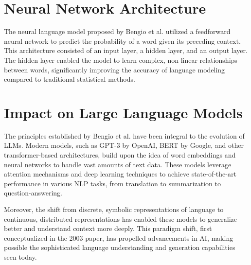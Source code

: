 \documentclass{article}
\begin{document}
\section*{Neural Network Architecture}

The neural language model proposed by Bengio et al. utilized a feedforward neural network to predict the probability of a word given its preceding context. This architecture consisted of an input layer, a hidden layer, and an output layer. The hidden layer enabled the model to learn complex, non-linear relationships between words, significantly improving the accuracy of language modeling compared to traditional statistical methods.

\section*{Impact on Large Language Models}

The principles established by Bengio et al. have been integral to the evolution of LLMs. Modern models, such as GPT-3 by OpenAI, BERT by Google, and other transformer-based architectures, build upon the idea of word embeddings and neural networks to handle vast amounts of text data. These models leverage attention mechanisms and deep learning techniques to achieve state-of-the-art performance in various NLP tasks, from translation to summarization to question-answering.

Moreover, the shift from discrete, symbolic representations of language to continuous, distributed representations has enabled these models to generalize better and understand context more deeply. This paradigm shift, first conceptualized in the 2003 paper, has propelled advancements in AI, making possible the sophisticated language understanding and generation capabilities seen today.
\end{document}
